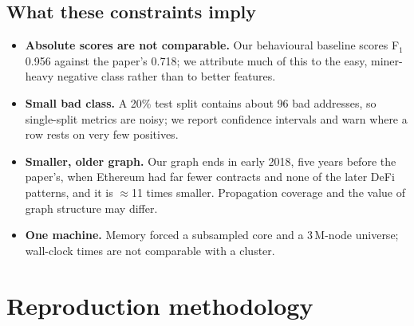 \documentclass[11pt,a4paper]{article}
\begin{document}
\subsection{What these constraints imply}
\begin{itemize}
\item \textbf{Absolute scores are not comparable.} Our behavioural baseline scores F$_1$ 0.956 against the paper's 0.718; we attribute much of this to the easy, miner-heavy negative class rather than to better features.
\item \textbf{Small bad class.} A 20\% test split contains about 96 bad addresses, so single-split metrics are noisy; we report confidence intervals and warn where a row rests on very few positives.
\item \textbf{Smaller, older graph.} Our graph ends in early 2018, five years before the paper's, when Ethereum had far fewer contracts and none of the later DeFi patterns, and it is $\approx$11 times smaller. Propagation coverage and the value of graph structure may differ.
\item \textbf{One machine.} Memory forced a subsampled core and a 3\,M-node universe; wall-clock times are not comparable with a cluster.
\end{itemize}

\section{Reproduction methodology}
\label{sec:method}
\end{document}
